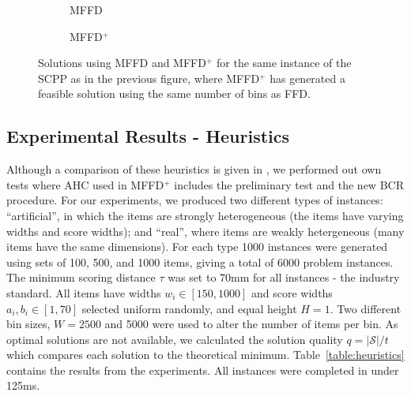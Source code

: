 \documentclass[authoryear]{elsarticle}
\begin{document}
\begin{figure}[H]	
	\centering
	\begin{subfigure}[h]{0.35\textwidth}
		
		\caption{MFFD}
		\label{fig:mffd}
	\end{subfigure} \hspace{15mm}
	\begin{subfigure}[h]{0.35\textwidth}
		
		\caption{MFFD$^+$}
		\label{fig:mffdplus}
	\end{subfigure}
	\caption{Solutions using MFFD and MFFD$^+$ for the same instance of the SCPP as in the previous figure, where MFFD$^+$ has generated a feasible solution using the same number of bins as FFD.}
	\label{fig:mffdvsmffdplus}
\end{figure}


\subsection{Experimental Results - Heuristics}
\label{sub:expheuristics}
\noindent Although a comparison of these heuristics is given in \citet{hawa2018}, we performed out own tests where AHC used in MFFD$^+$ includes the preliminary test and the new BCR procedure. For our experiments, we produced two different types of instances: ``artificial'', in which the items are strongly heterogeneous (the items have varying widths and score widths); and ``real'', where items are weakly hetergeneous (many items have the same dimensions). For each type 1000 instances were generated using sets of 100, 500, and 1000 items, giving a total of 6000 problem instances. The minimum scoring distance $\tau$ was set to 70mm for all instances - the industry standard. All items have widths $w_i \in [150,1000]$ and score widths $a_i, b_i \in [1,70]$ selected uniform randomly, and equal height $H=1$. Two different bin sizes, $W = 2500$ and 5000 were used to alter the number of items per bin. As optimal solutions are not available, we calculated the solution quality $q = |\mathcal{S}|/ t$ which compares each solution to the theoretical minimum. Table~\ref{table:heuristics} contains the results from the experiments. All instances were completed in under 125ms.
\end{document}
